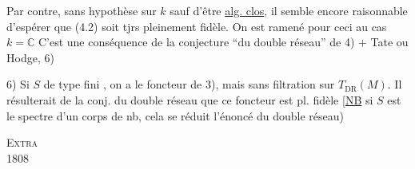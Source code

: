 Par contre, sans hypothèse sur $k$ sauf d'être \uline{alg. clos}, il semble encore raisonnable d'espérer que (4.2) soit tjrs pleinement fidèle.
On est ramené pour ceci au cas $k=\mathbb C$ C'est une conséquence de la conjecture ``du double réseau'' de 4) $+$ Tate ou Hodge,   6)

6) Si $S$ de type fini , on a le foncteur de 3), mais sans filtration sur $T_{\mathrm{DR}}(M)$. Il résulterait de la conj. du double réseau  que ce foncteur est pl. fidèle
[\uline{NB} si $S$ est le spectre d'un corps de nb, cela se réduit  l'énoncé du double réseau)
\par\noindent\textsc{}\hfill\textsc{Extra}\\
 1808\hfill{}


